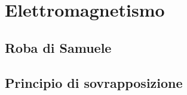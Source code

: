 \section{Elettromagnetismo}

    \subsection{Roba di Samuele}


    \subsection{Principio di sovrapposizione}
